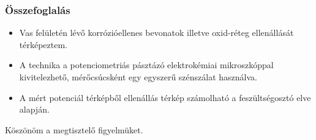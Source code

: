 \documentclass{beamer}
\begin{document}
\begin{frame}
	\frametitle{Összefoglalás}
	\centering
\begin{itemize}

\item Vas felületén lévő korrózióellenes bevonatok illetve oxid-réteg ellenállását térképeztem.

\item A technika a potenciometriás pásztázó elektrokémiai mikroszkóppal kivitelezhető, mérőcsúcsként egy egyszerű szénszálat használva.

\item A mért potenciál térképből ellenállás térkép számolható a feszültségosztó elve alapján.

\end{itemize}
\end{frame}

\begin{frame}
	\centering
	Köszönöm a megtisztelő figyelmüket.


\end{frame}
\end{document}
